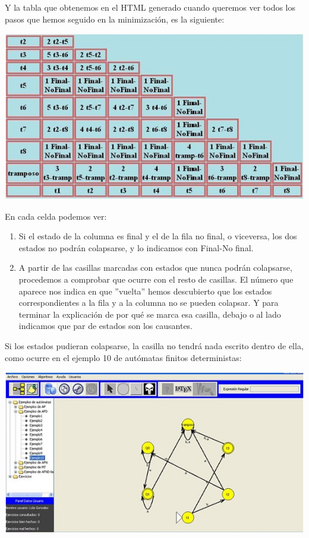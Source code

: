 \documentclass[12pt,a4paper,spanish]{book}
\begin{document}
Y la tabla que obtenemos en el HTML generado cuando queremos ver todos los pasos que hemos seguido en la minimizaci\'on, es la siguiente:

\begin{center}
\includegraphics{tabla1.jpg}
\end{center}

En cada celda podemos ver:
\begin{enumerate}
\item Si el estado de la columna es final y el de la fila no final, o viceversa, los dos estados no podr\'an colapsarse, y lo indicamos con Final-No final.

\item A partir de las casillas marcadas con estados que nunca podr\'an colapsarse, procedemos a comprobar que ocurre con el resto de casillas. El n\'umero que aparece nos indica en que ''vuelta'' hemos descubierto que los estados correspondientes a la fila y a la columna no se pueden colapsar. Y para terminar la explicaci\'on de por qu\'e se marca esa casilla, debajo o al lado indicamos que par de estados son los causantes.
\end{enumerate}
Si los estados pudieran colapsarse, la casilla no tendr\'a nada escrito dentro de ella, como ocurre en el ejemplo 10 de aut\'omatas finitos deterministas:

\begin{center}
\includegraphics{auto2.jpg}
\end{center}
\end{document}
